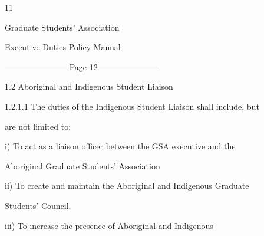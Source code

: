   

  

  

  

  

  

  

  

  

  

  

  

  

  

  

  

  

  

  

  

  

  

  



                                                 11  

                                  

                                Graduate Students’ Association  

                                Executive Duties Policy Manual  

  


----------------------- Page 12-----------------------

                         1.2      Aboriginal and Indigenous Student Liaison   

  

1.2.1.1            The duties of the Indigenous Student Liaison shall include, but  

         are not limited to:   

  

         i)        To act as a liaison officer between the GSA executive and the  

                   Aboriginal Graduate Students' Association   

  

         ii)       To create and maintain the Aboriginal and Indigenous Graduate  

                   Students’ Council.   

  

         iii)      To      increase       the     presence        of    Aboriginal          and     Indigenous  

